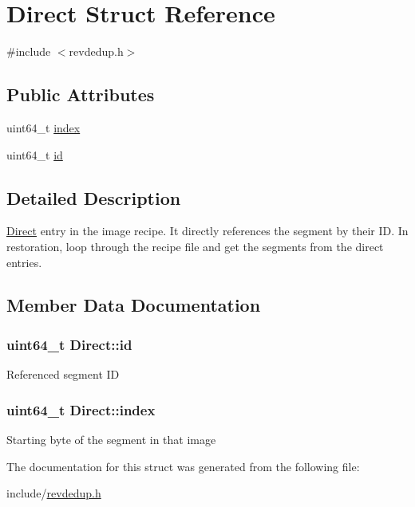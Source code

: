 \hypertarget{structDirect}{\section{\-Direct \-Struct \-Reference}
\label{structDirect}
}


{\ttfamily \#include $<$revdedup.\-h$>$}

\subsection*{\-Public \-Attributes}
\begin{DoxyCompactItemize}
\item 
uint64\-\_\-t \hyperlink{structDirect_a9ef6de54021820f3985e7f2eae3de38a}{index}
\item 
uint64\-\_\-t \hyperlink{structDirect_af87dc7a10a0d2e9c8e5d8ac250a95b33}{id}
\end{DoxyCompactItemize}


\subsection{\-Detailed \-Description}
\hyperlink{structDirect}{\-Direct} entry in the image recipe. \-It directly references the segment by their \-I\-D. \-In restoration, loop through the recipe file and get the segments from the direct entries. 

\subsection{\-Member \-Data \-Documentation}
\hypertarget{structDirect_af87dc7a10a0d2e9c8e5d8ac250a95b33}{
\subsubsection[{id}]{\setlength{\rightskip}{0pt plus 5cm}uint64\-\_\-t {\bf \-Direct\-::id}}}\label{structDirect_af87dc7a10a0d2e9c8e5d8ac250a95b33}
\-Referenced segment \-I\-D \hypertarget{structDirect_a9ef6de54021820f3985e7f2eae3de38a}{
\subsubsection[{index}]{\setlength{\rightskip}{0pt plus 5cm}uint64\-\_\-t {\bf \-Direct\-::index}}}\label{structDirect_a9ef6de54021820f3985e7f2eae3de38a}
\-Starting byte of the segment in that image 

\-The documentation for this struct was generated from the following file\-:\begin{DoxyCompactItemize}
\item 
include/\hyperlink{revdedup_8h}{revdedup.\-h}\end{DoxyCompactItemize}
